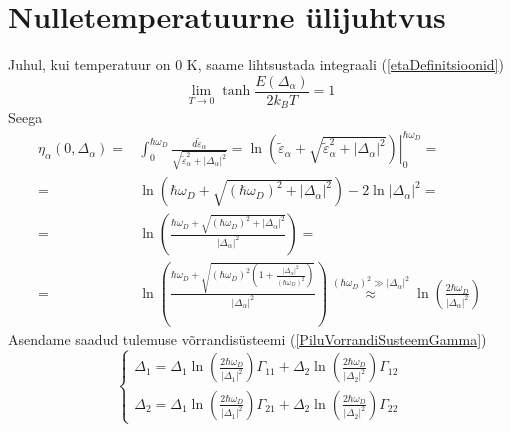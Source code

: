 \documentclass[class=article, crop=false]{standalone}
\begin{document}
\newpage	
\section{Nulletemperatuurne ülijuhtvus}
Juhul, kui temperatuur on 0 K, saame lihtsustada integraali (\ref{etaDefinitsioonid})
\begin{equation}\label{key}
	\lim_{T \rightarrow 0} \tanh \frac{E ( \Delta_{ \alpha})}{2 k_{B} T} = 1
\end{equation}
Seega
\begin{equation}\label{key}
	\begin{split}
		\eta_{ \alpha} (0, \Delta_{ \alpha}) = & \int_{0}^{ \hbar \omega_{D}} \frac{d \tilde{ \varepsilon}_{ \alpha}}{ \sqrt{ \tilde{ \varepsilon}_{ \alpha}^{2} + \left| \Delta_{ \alpha} \right|^{2}}} = \left. \ln \left( \tilde{ \varepsilon}_{ \alpha} + \sqrt{ \tilde{ \varepsilon}_{ \alpha}^{2} + \left| \Delta_{ \alpha} \right|^{2}} \right) \right|_{0}^{ \hbar \omega_{D}} = \\
		= & \ln \left( \hbar \omega_{D} + \sqrt{ \left( \hbar \omega_{D} \right)^{2} + \left| \Delta_{ \alpha} \right|^{2}} \right) - 2 \ln \left| \Delta_{ \alpha} \right|^{2} = \\
		= & \ln \left( \frac{ \hbar \omega_{D} + \sqrt{ \left( \hbar \omega_{D} \right)^{2} + \left| \Delta_{ \alpha} \right|^{2}}}{ \left| \Delta_{ \alpha} \right|^{2}} \right) = \\
		= & \ln \left( \frac{ \hbar \omega_{D} + \sqrt{ \left( \hbar \omega_{D} \right)^{2} \left( 1 + \frac{ \left| \Delta_{ \alpha} \right|^{2}}{ \left( \hbar \omega_{D} \right)^{2}} \right)}}{ \left| \Delta_{ \alpha} \right|^{2}} \right) \overset{\left( \hbar \omega_{D} \right)^{2} \gg \left| \Delta_{ \alpha} \right|^{2}}{ \approx} \ln \left( \frac{2 \hbar \omega_{D}}{ \left| \Delta_{ \alpha} \right|^{2}} \right) 
	\end{split}
\end{equation}
Asendame saadud tulemuse võrrandisüsteemi (\ref{PiluVorrandiSusteemGamma})
\begin{equation}\label{PiluVorrandiSusteemNullTemp}
	\begin{cases}
		\Delta_{1} = \Delta_{1} \ln \left( \frac{2 \hbar \omega_{D}}{ \left| \Delta_{ 1} \right|^{2}} \right) \Gamma_{11} + 
		\Delta_{2} \ln \left( \frac{2 \hbar \omega_{D}}{ \left| \Delta_{ 2} \right|^{2}} \right) \Gamma_{12} \\
		\Delta_{2} = \Delta_{1} \ln \left( \frac{2 \hbar \omega_{D}}{ \left| \Delta_{ 1} \right|^{2}} \right) \Gamma_{21} + \Delta_{2} \ln \left( \frac{2 \hbar \omega_{D}}{ \left| \Delta_{ 2} \right|^{2}} \right) \Gamma_{22}
	\end{cases}
\end{equation}
\end{document}
